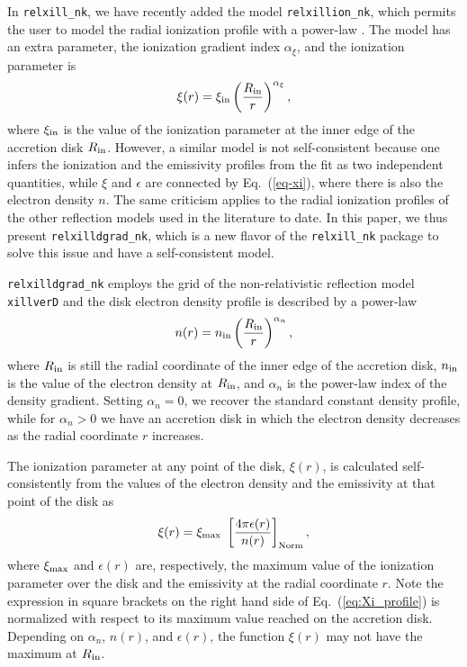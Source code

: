 \documentclass[twocolumn]{emulateapj}
\newcommand{\be}{\begin{eqnarray}}
\newcommand{\ee}{\end{eqnarray}}
\begin{document}
In {\tt relxill\_nk}, we have recently added the model {\tt relxillion\_nk}, which permits the user to model the radial ionization profile with a power-law \citep{2021PhRvD.103j3023A}. The model has an extra parameter, the ionization gradient index $\alpha_\xi$, and the ionization parameter is
\be
\xi(r)=\xi_{\rm in} \left( \frac{R_{\rm in}}{r} \right)^{\alpha_\xi},
\ee
where $\xi_{\rm in}$ is the value of the ionization parameter at the inner edge of the accretion disk $R_{\rm in}$. However, a similar model is not self-consistent because one infers the ionization and the emissivity profiles from the fit as two independent quantities, while $\xi$ and $\epsilon$ are connected by Eq.~(\ref{eq-xi}), where there is also the electron density $n$. The same criticism applies to the radial ionization profiles of the other reflection models used in the literature to date. In this paper, we thus present {\tt relxilldgrad\_nk}, which is a new flavor of the {\tt relxill\_nk} package to solve this issue and have a self-consistent model.


{\tt relxilldgrad\_nk} employs the grid of the non-relativistic reflection model {\tt xillverD} and the disk electron density profile is described by a power-law
\be\label{eq:N_profile}
n(r)=n_{\rm in} \left( \frac{R_{\rm in}}{r} \right)^{\alpha_n},
\ee
where $R_{\rm in}$ is still the radial coordinate of the inner edge of the accretion disk, $n_{\rm in}$ is the value of the electron density at $R_{\rm in}$, and $\alpha_n$ is the power-law index of the density gradient. Setting $ \alpha_n=0 $, we recover the standard constant density profile, while for $\alpha_n>0$ we have an accretion disk in which the electron density decreases as the radial coordinate $r$ increases.


The ionization parameter at any point of the disk, $\xi(r)$, is calculated self-consistently from the values of the electron density and the emissivity at that point of the disk as 
\be\label{eq:Xi_profile}
\xi(r) = \xi_{\rm max} \ \left[ \frac{4\pi \epsilon(r)}{n(r)} \right]_{\rm Norm},
\ee
where $\xi_{\rm max}$ and $\epsilon(r)$ are, respectively, the maximum value of the ionization parameter over the disk and the emissivity at the radial coordinate $r$. Note the expression in square brackets on the right hand side of Eq.~(\ref{eq:Xi_profile}) is normalized with respect to its maximum value reached on the accretion disk. Depending on $\alpha_n$, $n(r)$, and $\epsilon(r)$, the function $\xi(r)$ may not have the maximum at $R_{\rm in}$.
\end{document}
